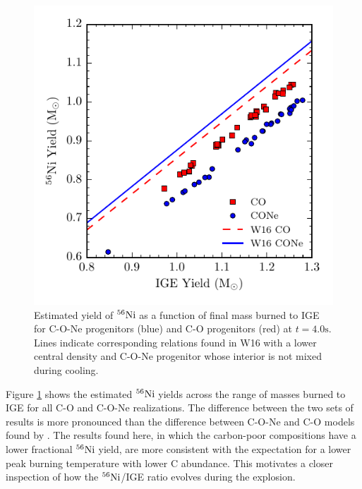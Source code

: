 \documentclass[iop,apj]{emulateapj}
\newcommand{\Ni}[1]{\ensuremath{{}^{#1}{\rm Ni}}}
\newcommand{\unitstyle}[1]{\ensuremath{\mathrm{#1}}}
\newcommand{\second}{\unitstyle{s}}
\begin{document}
\begin{figure}
\includegraphics[width=\columnwidth]{figures/ni56_v_ige.pdf}
\caption{\label{fig:conversion}
Estimated yield of \Ni{56} as a function of final mass burned to IGE
for C-O-Ne progenitors (blue) and C-O progenitors (red) at
$t = 4.0 \second$.  Lines indicate corresponding relations found in W16 with
a lower central density and C-O-Ne progenitor whose interior is not mixed
during cooling.
}
\end{figure}
Figure \ref{fig:conversion} shows the estimated \Ni{56} yields
across the range of masses burned to IGE
for all C-O and C-O-Ne realizations.
The difference between the two sets of results is more pronounced
than the difference between C-O-Ne and C-O models found by \citet{willcoxetal2016}.
The results found here, in which the carbon-poor compositions have a lower fractional \Ni{56} yield, are more consistent with the expectation for a lower peak burning temperature with lower C abundance.
This motivates a closer inspection of how the \Ni{56}/IGE ratio evolves during the explosion.
\end{document}
